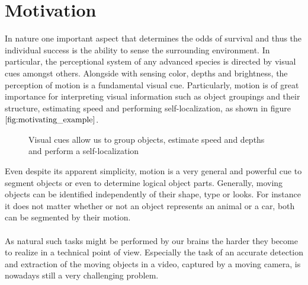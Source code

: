\section{Motivation}
In nature one important aspect that determines the odds of survival and thus the individual success is the ability to sense the surrounding environment. In particular, the perceptional system of any advanced species is directed by visual cues amongst others. Alongside with sensing color, depths and brightness, the perception of motion is a fundamental visual cue. Particularly, motion is of great importance for interpreting visual information such as object groupings and their structure, estimating speed and performing self-localization, as shown in figure $\ref{fig:motivating_example}$.
\begin{figure}[H]
\begin{center}
\end{center}
\caption[Motivating Example]{Visual cues allow us to group objects, estimate speed and depths and perform a self-localization}
\label{fig:motivating_example}
\end{figure}
Even despite its apparent simplicity, motion is a very general and powerful cue to segment objects or even to determine logical object parts. Generally, moving objects can be identified independently of their shape, type or looks. For instance it does not matter whether or not an object represents an animal or a car, both can be segmented by their motion. \\ \\
As natural such tasks might be performed by our brains the harder they become to realize in a technical point of view. Especially the task of an accurate detection and extraction of the moving objects in a video, captured by a moving camera, is nowadays still a very challenging problem. \\ \\
